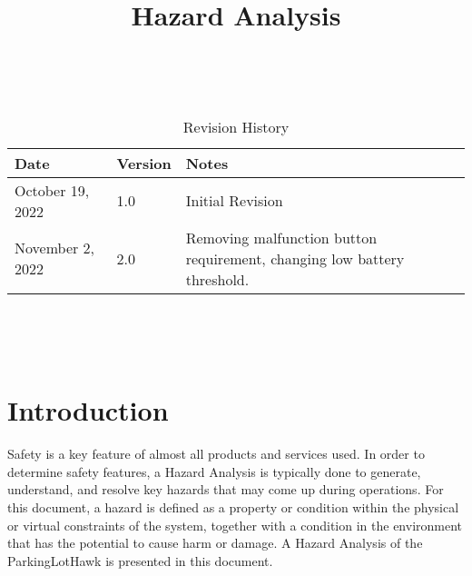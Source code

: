 \documentclass{article}
\title{Hazard Analysis\\\progname}
\author{\authname}
\date{}
\begin{document}
\maketitle
\thispagestyle{empty}

~\newpage


\begin{table}[hp]
\caption{Revision History} \label{TblRevisionHistory}
\begin{tabularx}{\textwidth}{llX}
\toprule
\toprule {\bf Date} & {\bf Version} & {\bf Notes}\\
\midrule
October 19, 2022 & 1.0 & Initial Revision \\
\midrule
November 2, 2022 & 2.0 & Removing malfunction button requirement, changing low battery threshold. \\
\bottomrule
\end{tabularx}
\end{table}

~\newpage

\tableofcontents

\listoftables

\listoffigures

~\newpage









\section{Introduction}

Safety is a key feature of almost all products and services used. In order to determine safety features, a Hazard Analysis is typically done to generate, understand, and resolve key hazards that may come up during operations. For this document, a hazard is defined as a property or condition within the physical or virtual constraints of the system, together with a condition in the environment that has the potential to cause harm or damage. A Hazard Analysis of the ParkingLotHawk is presented in this document. 

\end{document}
